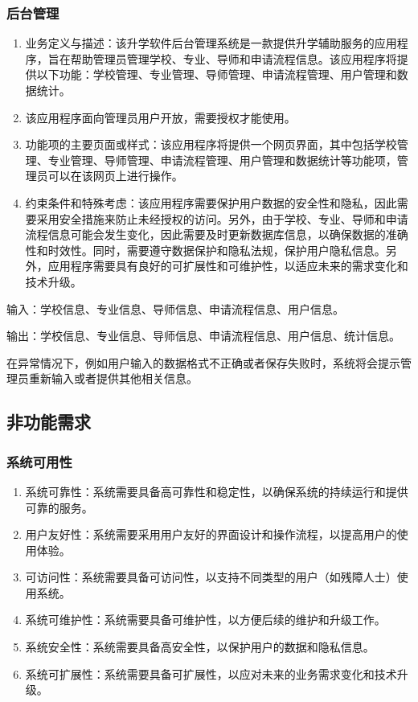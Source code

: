 \documentclass[UTF8]{ctexart}
\newcommand{\m}[1]{\textcolor{modify}{#1}}
\begin{document}
    \subsubsection{后台管理}
    \begin{enumerate}
        \item 业务定义与描述：\m{该升学软件后台管理系统是一款提供升学辅助服务的应用程序，旨在帮助管理员管理学校、专业、导师和申请流程信息。该应用程序将提供以下功能：学校管理、专业管理、导师管理、申请流程管理、用户管理和数据统计。}
        \item 该应用程序面向管理员用户开放，需要授权才能使用。
        \item 功能项的主要页面或样式：该应用程序将提供一个网页界面，其中包括学校管理、专业管理、导师管理、申请流程管理、用户管理和数据统计等功能项，管理员可以在该网页上进行操作。
        \item 约束条件和特殊考虑：\m{该应用程序需要保护用户数据的安全性和隐私，因此需要采用安全措施来防止未经授权的访问。另外，由于学校、专业、导师和申请流程信息可能会发生变化，因此需要及时更新数据库信息，以确保数据的准确性和时效性。同时，需要遵守数据保护和隐私法规，保护用户隐私信息。另外，应用程序需要具有良好的可扩展性和可维护性，以适应未来的需求变化和技术升级。}
    \end{enumerate}
    \par
    输入：学校信息、专业信息、导师信息、申请流程信息、用户信息。
    \par
    输出：学校信息、专业信息、导师信息、申请流程信息、用户信息、统计信息。
    \par
    在异常情况下，例如用户输入的数据格式不正确或者保存失败时，系统将会提示管理员重新输入或者提供其他相关信息。

    \subsection{非功能需求}
    \subsubsection{系统可用性}
    \m{
        \begin{enumerate}
            \item 系统可靠性：系统需要具备高可靠性和稳定性，以确保系统的持续运行和提供可靠的服务。
            \item 用户友好性：系统需要采用用户友好的界面设计和操作流程，以提高用户的使用体验。
            \item 可访问性：系统需要具备可访问性，以支持不同类型的用户（如残障人士）使用系统。
            \item 系统可维护性：系统需要具备可维护性，以方便后续的维护和升级工作。
            \item 系统安全性：系统需要具备高安全性，以保护用户的数据和隐私信息。
            \item 系统可扩展性：系统需要具备可扩展性，以应对未来的业务需求变化和技术升级。
        \end{enumerate}
    }
\end{document}
